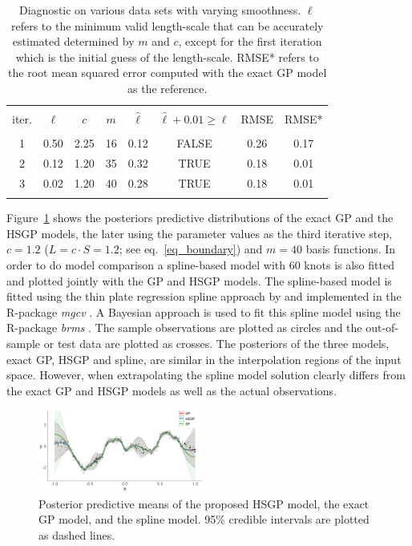\begin{table}
\centering
\setlength{\tabcolsep}{4pt}
\begin{tabular}{cccccccc}
\arrayrulecolor{gray}\hline \\[-3mm]
iter. & $\ell$ & $c$ & $m$ & $\hat{\ell}$ & $\hat{\ell} + 0.01 \geq \ell$ & RMSE & RMSE* \\ 
\arrayrulecolor{lightgray}\hline \\[-1mm]
 1 & 0.50 & 2.25 & 16 & 0.12 & FALSE & 0.26 & 0.17 \\
 2 & 0.12 & 1.20 & 35 & 0.32 & TRUE & 0.18 & 0.01 \\
 3 & 0.02 & 1.20 & 40 & 0.28 & TRUE & 0.18 & 0.01 \\[1mm]
\arrayrulecolor{gray}\hline
\end{tabular}
\caption{Diagnostic on various data sets with varying smoothness. $\ell$ refers to the minimum valid length-scale that can be accurately estimated determined by $m$ and $c$, except for the first iteration which is the initial guess of the length-scale. RMSE* refers to the root mean squared error computed with the exact GP model as the reference.}
  \label{tab_caseI}
\end{table}

Figure~\ref{fig8_Posteriors_exI} shows the posteriors predictive distributions of the exact GP and the HSGP models, the later using the parameter values as the third iterative step, $c=1.2$ ($L=c\cdot S= 1.2$; see eq.~\eqref{eq_boundary}) and $m=40$ basis functions. In order to do model comparison a spline-based model with 60 knots is also fitted and plotted jointly with the GP and HSGP models. The spline-based model is fitted using the thin plate regression spline approach by \citet{wood2003thin} and implemented in the R-package \textit{mgcv} \citep{wood2011mgcv}. A Bayesian approach is used to fit this spline model using the R-package \textit{brms} \citep{burkner2017brms}. The sample observations are plotted as circles and the out-of-sample or test data are plotted as crosses. The posteriors of the three models, exact GP, HSGP and spline, are similar in the interpolation regions of the input space. However, when extrapolating the spline model solution clearly differs from the exact GP and HSGP models as well as the actual observations. 

\begin{figure}
\centering
\includegraphics[width=0.485\textwidth]{fig8_Posteriors_exI.png}
\caption{Posterior predictive means of the proposed HSGP model, the exact GP model, and the spline model. 95\% credible intervals are plotted as dashed lines.}
  \label{fig8_Posteriors_exI}
\end{figure}


